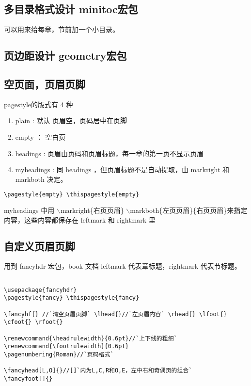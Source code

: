 \subsection{多目录格式设计 minitoc宏包}
可以用来给每章，节前加一个小目录。

\subsection{页边距设计 geometry宏包}
\begin{cmd}
  \usepackage[top=2.54cm,bottom=2.54cm,left=2cm,
  right=2cm,includehead,includefoot]{geometry}
\end{cmd}

\subsection{空页面，页眉页脚}
pagestyle的版式有 4 种\\
\begin{enumerate}
  \item plain : 默认 页眉空，页码居中在页脚
  \item empty ： 空白页
  \item headings : 页眉由页码和页眉标题，每一章的第一页不显示页眉
  \item myheadings : 同 headings ，但页眉标题不是自动提取，由
  markright 和 markboth 决定。
\end{enumerate}

\begin{lstlisting}
\pagestyle{empty} \thispagestyle{empty}
\end{lstlisting}


myheadings 中用 $\backslash$markright\{右页页眉\}
$\backslash$markboth\{左页页眉\}\{右页页眉\}来指定内容，这些内容都保存在
leftmark 和 rightmark 里

\subsection{自定义页眉页脚}
用到 fancyhdr 宏包，book 文档 leftmark 代表章标题，rightmark
代表节标题。
\begin{lstlisting}[language={[LaTeX]TeX}]

\usepackage{fancyhdr}
\pagestyle{fancy} \thispagestyle{fancy}

\fancyhf{} //`清空页眉页脚` \lhead{}//`左页眉内容` \rhead{} \lfoot{}
\cfoot{} \rfoot{}

\renewcommand{\headrulewidth}{0.6pt}//`上下线的粗细`
\renewcommand{\footrulewidth}{0.6pt}
\pagenumbering{Roman}//`页码格式`

\fancyhead[L,O]{}//[]`内为L,C,R和O,E，左中右和奇偶页的组合`
\fancyfoot[]{}

\end{lstlisting}

